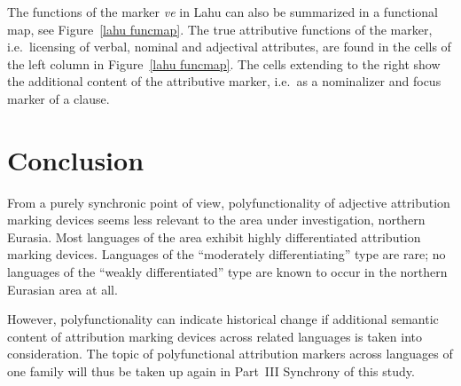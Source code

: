 The functions of the marker \textit{ve} in Lahu can also be summarized in a functional map, see Figure~\ref{lahu funcmap}. The true attributive functions of the marker, i.e.~licensing of verbal, nominal and adjectival attributes, are found in the cells of the left column in Figure~\ref{lahu funcmap}. The cells extending to the right show the additional content of the attributive marker, i.e.~as a nominalizer and focus marker of a clause.

\section{Conclusion}
From a purely synchronic point of view, polyfunctionality of adjective attribution marking devices seems less relevant to the area under investigation, northern Eurasia. Most languages of the area exhibit highly differentiated attribution marking devices. Languages of the “moderately differentiating” type are rare; no languages of the “weakly differentiated” type are known to occur in the northern Eurasian area at all.

However, polyfunctionality can indicate historical change if additional semantic content of attribution marking devices across related languages is taken into consideration. The topic of polyfunctional attribution markers across languages of one family will thus be taken up again in Part~III Synchrony of this study.

